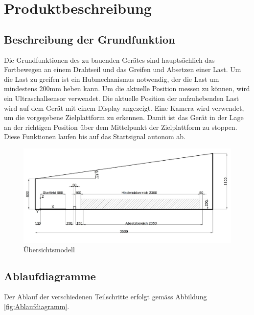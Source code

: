\documentclass[a4paper]{report}
\begin{document}
\chapter{Produktbeschreibung}
\label{ch:Produktbeschreibung}

\section{Beschreibung der Grundfunktion}
\label{sec:GrundBeschrieb}
Die Grundfunktionen des zu bauenden Gerätes sind hauptsächlich das Fortbewegen an einem Drahtseil und das Greifen und Absetzen einer Last. Um die Last zu greifen ist ein Hubmechanismus notwendig, der die Last um mindestens 200mm heben kann. Um die aktuelle Position messen zu können, wird ein Ultraschallsensor verwendet. Die aktuelle Position der aufzuhebenden Last wird auf dem Gerät mit einem Display angezeigt. Eine Kamera wird verwendet, um die vorgegebene Zielplattform zu erkennen. Damit ist das Gerät in der Lage an der richtigen Position über dem Mittelpunkt der Zielplattform zu stoppen. Diese Funktionen laufen bis auf das Startsignal autonom ab.

\begin{figure}[h!]
	\includegraphics[keepaspectratio,width=\textwidth]{PrenFunktionsskizze}
	\caption{Übersichtsmodell}
	\label{fig:Funktionsskizze}
\end{figure}

\newpage
\section{Ablaufdiagramme}
\label{sec:Ablaufdiagramme}
Der Ablauf der verschiedenen Teilschritte erfolgt gemäss Abbildung \ref{fig:Ablaufdiagramm}.
\end{document}
